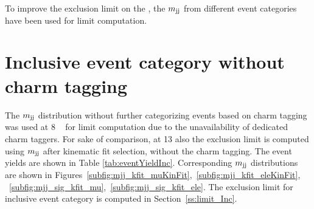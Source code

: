 To improve the exclusion limit on the \brThb, the $m_\text{jj}$ from different 
event categories have been used for limit computation.
\section{Inclusive event category without charm tagging}
\label{ss:mjj_Inc}
The $m_\text{jj}$ distribution without further categorizing events based on charm 
tagging was used at 8 \TeV~\cite{Khachatryan:2015uua} for limit computation due 
to the unavailability of dedicated charm taggers. For sake of comparison, at 
13 \TeV also the exclusion limit is computed using $m_\text{jj}$ after kinematic fit
selection, without the charm tagging. The event yields are shown in Table
\ref{tab:eventYieldInc}. Corresponding $m_\text{jj}$ distributions are shown in 
Figures~\ref{subfig:mjj_kfit_muKinFit},~\ref{subfig:mjj_kfit_eleKinFit}, 
~\ref{subfig:mjj_sig_kfit_mu},~\ref{subfig:mjj_sig_kfit_ele}. The exclusion 
limit for inclusive event category is computed in Section~\ref{ss:limit_Inc}. 

